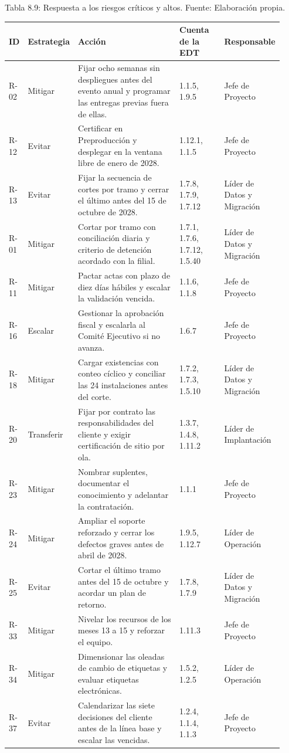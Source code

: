 \documentclass[11pt]{article}
\begin{document}
Tabla 8.9: Respuesta a los riesgos críticos y altos. Fuente: Elaboración propia.

\begin{longtable}{p{0.069\linewidth}p{0.109\linewidth}p{0.406\linewidth}p{0.178\linewidth}p{0.168\linewidth}}
\toprule
\textbf{ID} & \textbf{Estrategia} & \textbf{Acción} & \textbf{Cuenta de la EDT} & \textbf{Responsable} \\
\midrule
\endhead
\bottomrule
\endlastfoot
R-02 & Mitigar & Fijar ocho semanas sin despliegues antes del evento anual y programar las entregas previas fuera de ellas. & 1.1.5, 1.9.5 & Jefe de Proyecto \\
R-12 & Evitar & Certificar en Preproducción y desplegar en la ventana libre de enero de 2028. & 1.12.1, 1.1.5 & Jefe de Proyecto \\
R-13 & Evitar & Fijar la secuencia de cortes por tramo y cerrar el último antes del 15 de octubre de 2028. & 1.7.8, 1.7.9, 1.7.12 & Líder de Datos y Migración \\
R-01 & Mitigar & Cortar por tramo con conciliación diaria y criterio de detención acordado con la filial. & 1.7.1, 1.7.6, 1.7.12, 1.5.40 & Líder de Datos y Migración \\
R-11 & Mitigar & Pactar actas con plazo de diez días hábiles y escalar la validación vencida. & 1.1.6, 1.1.8 & Jefe de Proyecto \\
R-16 & Escalar & Gestionar la aprobación fiscal y escalarla al Comité Ejecutivo si no avanza. & 1.6.7 & Jefe de Proyecto \\
R-18 & Mitigar & Cargar existencias con conteo cíclico y conciliar las 24 instalaciones antes del corte. & 1.7.2, 1.7.3, 1.5.10 & Líder de Datos y Migración \\
R-20 & Transferir & Fijar por contrato las responsabilidades del cliente y exigir certificación de sitio por ola. & 1.3.7, 1.4.8, 1.11.2 & Líder de Implantación \\
R-23 & Mitigar & Nombrar suplentes, documentar el conocimiento y adelantar la contratación. & 1.1.1 & Jefe de Proyecto \\
R-24 & Mitigar & Ampliar el soporte reforzado y cerrar los defectos graves antes de abril de 2028. & 1.9.5, 1.12.7 & Líder de Operación \\
R-25 & Evitar & Cortar el último tramo antes del 15 de octubre y acordar un plan de retorno. & 1.7.8, 1.7.9 & Líder de Datos y Migración \\
R-33 & Mitigar & Nivelar los recursos de los meses 13 a 15 y reforzar el equipo. & 1.11.3 & Jefe de Proyecto \\
R-34 & Mitigar & Dimensionar las oleadas de cambio de etiquetas y evaluar etiquetas electrónicas. & 1.5.2, 1.2.5 & Líder de Operación \\
R-37 & Evitar & Calendarizar las siete decisiones del cliente antes de la línea base y escalar las vencidas. & 1.2.4, 1.1.4, 1.1.3 & Jefe de Proyecto \\
\end{longtable}
\end{document}
